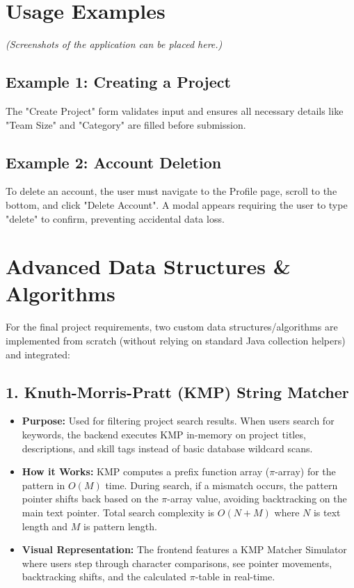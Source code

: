 \documentclass[12pt,a4paper]{article}
\begin{document}
\section{Usage Examples}
\textit{(Screenshots of the application can be placed here.)}

\subsection{Example 1: Creating a Project}
The "Create Project" form validates input and ensures all necessary details like "Team Size" and "Category" are filled before submission.

\subsection{Example 2: Account Deletion}
To delete an account, the user must navigate to the Profile page, scroll to the bottom, and click "Delete Account". A modal appears requiring the user to type "delete" to confirm, preventing accidental data loss.

\section{Advanced Data Structures \& Algorithms}
For the final project requirements, two custom data structures/algorithms are implemented from scratch (without relying on standard Java collection helpers) and integrated:

\subsection{1. Knuth-Morris-Pratt (KMP) String Matcher}
\begin{itemize}
    \item \textbf{Purpose:} Used for filtering project search results. When users search for keywords, the backend executes KMP in-memory on project titles, descriptions, and skill tags instead of basic database wildcard scans.
    \item \textbf{How it Works:} KMP computes a prefix function array ($\pi$-array) for the pattern in $O(M)$ time. During search, if a mismatch occurs, the pattern pointer shifts back based on the $\pi$-array value, avoiding backtracking on the main text pointer. Total search complexity is $O(N + M)$ where $N$ is text length and $M$ is pattern length.
    \item \textbf{Visual Representation:} The frontend features a KMP Matcher Simulator where users step through character comparisons, see pointer movements, backtracking shifts, and the calculated $\pi$-table in real-time.
\end{itemize}
\end{document}
